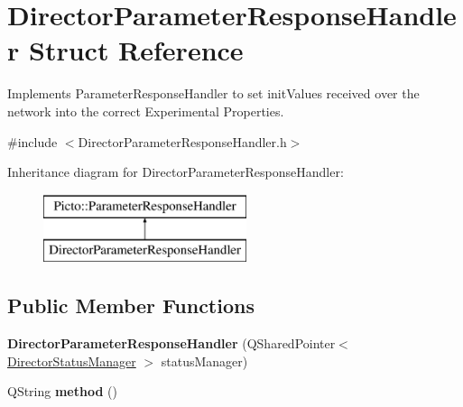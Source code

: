 \hypertarget{struct_director_parameter_response_handler}{\section{Director\-Parameter\-Response\-Handler Struct Reference}
\label{struct_director_parameter_response_handler}
}


Implements Parameter\-Response\-Handler to set init\-Values received over the network into the correct Experimental Properties.  




{\ttfamily \#include $<$Director\-Parameter\-Response\-Handler.\-h$>$}

Inheritance diagram for Director\-Parameter\-Response\-Handler\-:\begin{figure}[H]
\begin{center}
\leavevmode
\includegraphics[height=2.000000cm]{struct_director_parameter_response_handler}
\end{center}
\end{figure}
\subsection*{Public Member Functions}
\begin{DoxyCompactItemize}
\item 
\hypertarget{struct_director_parameter_response_handler_ab5b696aa1d65ef94af715b9272279b5d}{{\bfseries Director\-Parameter\-Response\-Handler} (Q\-Shared\-Pointer$<$ \hyperlink{class_director_status_manager}{Director\-Status\-Manager} $>$ status\-Manager)}\label{struct_director_parameter_response_handler_ab5b696aa1d65ef94af715b9272279b5d}

\item 
\hypertarget{struct_director_parameter_response_handler_ae7e0c97f6a42ffc61bc20859d0f37957}{Q\-String {\bfseries method} ()}\label{struct_director_parameter_response_handler_ae7e0c97f6a42ffc61bc20859d0f37957}

\end{DoxyCompactItemize}
